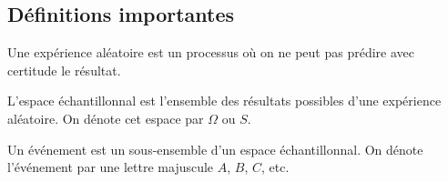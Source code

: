 \documentclass[10pt, french]{article}
\begin{document}
\begin{multicols*}{2}
\subsection{Définitions importantes}
\begin{definitionNOHFILL}
Une expérience aléatoire est un processus où on ne peut pas prédire avec certitude le résultat. 
\end{definitionNOHFILL}
\begin{definitionNOHFILL}
L'espace échantillonnal est l'ensemble des résultats possibles d'une expérience aléatoire. On dénote cet espace par $\Omega$ ou $S$.
\end{definitionNOHFILL}
\begin{definitionNOHFILL}[Événement]
Un événement est un sous-ensemble d'un espace échantillonnal. On dénote l'événement par une lettre majuscule $A$, $B$, $C$, etc.
\end{definitionNOHFILL}

\end{multicols*}
\end{document}
